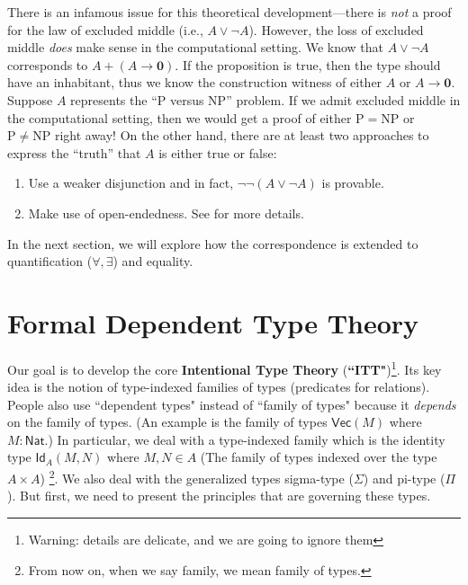 \documentclass{article}
\begin{document}
There is an infamous issue for this theoretical development---there is 
\emph{not} a proof for the law of excluded middle (i.e., $A \vee \neg A$).
However, the loss of excluded middle \emph{does} make sense in the computational 
setting.
We know that $A \vee \neg A$ corresponds to $A + (A \to \mathbf{0})$.
If the 
proposition is true, then the type should have an inhabitant, thus we know the 
construction witness of either $A$ or $A \to \mathbf{0}$.
Suppose $A$ represents the ``P versus NP'' problem.
If we admit excluded middle in the computational setting, then we would get a proof 
of either $\mathrm{P} = \mathrm{NP}$ or $\mathrm{P} \neq \mathrm{NP}$ right 
away!
On the other hand, there are at least two approaches to express the ``truth'' that 
$A$ is either true or false:
\begin{enumerate}
	\item Use a weaker disjunction and in fact, $\neg\neg(A \vee \neg A)$ is provable.
	\item Make use of open-endedness. See \cite{Howe:91} for more details.
\end{enumerate}

In the next section, we will explore how the correspondence is extended to 
quantification ($\forall,\exists$) and equality.

\newcommand{\sfid}{\mathsf{Id}}
\newcommand{\sfif}{\mathsf{if}}
\newcommand{\sfIf}{\mathsf{If}}
\newcommand{\tNat}{\mathsf{Nat}}
\newcommand{\tBool}{\mathsf{Bool}}
\newcommand{\ett}{\mathsf{tt}}
\newcommand{\eff}{\mathsf{ff}}

\section{Formal Dependent Type Theory}
Our goal is to develop the core {\bf Intentional Type Theory} ({\bf ``ITT"})\footnote{Warning: details are delicate, and we are going to ignore them}. 
Its key idea is the notion of type-indexed families of types (predicates for relations). People also use ``dependent types"  instead of ``family of types" because it {\it depends} on the family of types. (An example is the family of types $\mathsf{Vec}(M)$ where $M:\tNat$.) In particular, we deal with a type-indexed family which is the identity type $\sfid_{A}(M,N)$ where $M,N \in A$ (The family of types indexed over the type $A \times A$) 
\footnote{From now on, when we say family, we mean family of types.}. We also deal with the generalized types sigma-type ($\Sigma$) and pi-type ($\Pi$). But first, we need to present the principles that are governing these types.
\end{document}
